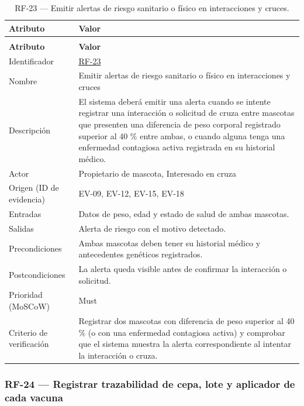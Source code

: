 \documentclass[journal,onecolumn]{IEEEtran}
\makeatletter
\newenvironment{atributos}[2]{%
	\small
	\begin{longtable}{@{}>{\raggedright\arraybackslash}p{4.2cm} >{\raggedright\arraybackslash}p{11.2cm}@{}}
		\caption{#2}\label{tab:#1}\\
		\toprule
		\textbf{Atributo} & \textbf{Valor} \\
		\midrule
		\endfirsthead
		\multicolumn{2}{@{}l}{\small\itshape (continuación)}\\
		\toprule
		\textbf{Atributo} & \textbf{Valor} \\
		\midrule
		\endhead
		\bottomrule
		\endlastfoot
	}{%
	\end{longtable}
	\normalsize
}
\makeatother
\begin{document}
	\begin{atributos}{RF-23}{RF-23 --- Emitir alertas de riesgo sanitario o físico en interacciones y cruces.}
		Identificador & \hyperref[tab:RF-23]{RF-23} \\
		Nombre & Emitir alertas de riesgo sanitario o físico en interacciones y cruces \\
		Descripción & El sistema deberá emitir una alerta cuando se intente registrar una interacción o solicitud de cruza entre mascotas que presenten una diferencia de peso corporal registrado superior al 40 \% entre ambas, o cuando alguna tenga una enfermedad contagiosa activa registrada en su historial médico. \\
		Actor & Propietario de mascota, Interesado en cruza \\
		Origen (ID de evidencia) & EV-09, EV-12, EV-15, EV-18 \\
		Entradas & Datos de peso, edad y estado de salud de ambas mascotas. \\
		Salidas & Alerta de riesgo con el motivo detectado. \\
		Precondiciones & Ambas mascotas deben tener su historial médico y antecedentes genéticos registrados. \\
		Postcondiciones & La alerta queda visible antes de confirmar la interacción o solicitud. \\
		Prioridad (MoSCoW) & Must \\
		Criterio de verificación & Registrar dos mascotas con diferencia de peso superior al 40 \% (o con una enfermedad contagiosa activa) y comprobar que el sistema muestra la alerta correspondiente al intentar la interacción o cruza. \\
	\end{atributos}
	
	\subsubsection{RF-24 --- Registrar trazabilidad de cepa, lote y aplicador de cada vacuna}
	
\end{document}
